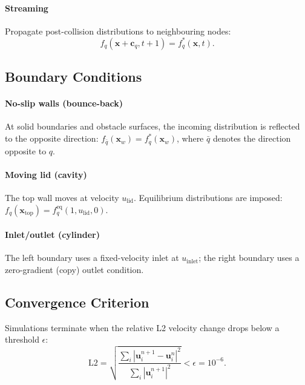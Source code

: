\documentclass[journal]{IEEEtran}
\begin{document}
\paragraph{Streaming} Propagate post-collision distributions to
neighbouring nodes:
\begin{equation}
  f_q(\mathbf{x} + \mathbf{c}_q, t + 1) = f_q^{*}(\mathbf{x}, t).
  \label{eq:stream}
\end{equation}

\subsection{Boundary Conditions}

\paragraph{No-slip walls (bounce-back)}
At solid boundaries and obstacle surfaces, the incoming distribution
is reflected to the opposite direction:
$f_{\bar{q}}(\mathbf{x}_w) = f_q^{*}(\mathbf{x}_w)$,
where $\bar{q}$ denotes the direction opposite to $q$.

\paragraph{Moving lid (cavity)}
The top wall moves at velocity $u_{\mathrm{lid}}$.  Equilibrium
distributions are imposed:
$f_q(\mathbf{x}_{\mathrm{top}}) = f_q^{\mathrm{eq}}(1, u_{\mathrm{lid}}, 0)$.

\paragraph{Inlet/outlet (cylinder)}
The left boundary uses a fixed-velocity inlet at $u_{\mathrm{inlet}}$;
the right boundary uses a zero-gradient (copy) outlet condition.

\subsection{Convergence Criterion}
Simulations terminate when the relative L2 velocity change drops below
a threshold $\epsilon$:
\begin{equation}
  \mathrm{L2} = \sqrt{\frac{\sum_i |\mathbf{u}_i^{n+1} - \mathbf{u}_i^{n}|^2}
       {\sum_i |\mathbf{u}_i^{n+1}|^2}} < \epsilon = 10^{-6}.
  \label{eq:l2}
\end{equation}

\end{document}
